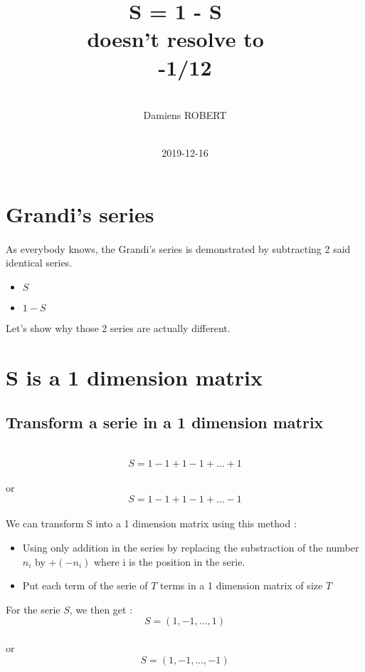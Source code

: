 \documentclass{article}
\title{S = 1 - S
~\\
doesn't resolve to
~\\
-1/12
}
\date{
~\\
2019-12-16
}
\author{
~\\
Damiens ROBERT
}
\begin{document}
  \maketitle
  \section{Grandi's series}
  \paragraph{}
    As everybody knows, the Grandi's series is demonstrated by subtracting 2 said identical series.
    \begin{itemize}
      \item
  	    $S$
      \item
  	    $1 - S$
    \end{itemize}
    Let's show why those 2 series are actually different.
  \section{S is a 1 dimension matrix}
    \subsection{Transform a serie in a 1 dimension matrix}
      ~\\
      \begin{equation*}
        S = 1 - 1 + 1 - 1 + ... + 1
      \end{equation*}
      ~\\
      or
      ~\\
      \begin{equation*}
        S = 1 - 1 + 1 - 1 + ... - 1
      \end{equation*}
      ~\\
      We can transform S into a 1 dimension matrix using this method :
      \begin{itemize}
        \item
          Using only addition in the series by replacing the substraction of the number $n_i$ by $+ (-n_i)$ where i is the position in the serie.
        \item
	  Put each term of the serie of $T$ terms in a 1 dimension matrix of size $T$
      \end{itemize}

      For the serie $S$, we then get :
      ~\\
      \begin{equation*}
        S = (1, -1, ..., 1)
      \end{equation*}
      ~\\
      or
      ~\\
      \begin{equation*}
        S = (1, -1, ..., -1)
      \end{equation*}
      ~\\
\end{document}
